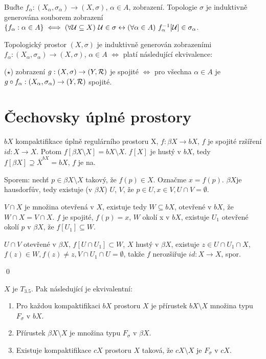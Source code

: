 \documentclass[12pt,a4paper]{article}
\newcommand\BX{\ensuremath{\beta X}}
\newcommand\Tich{$T_{3.5}$\xspace}
\newcommand\close{\overline}
\begin{document}
\tvrzeni Buďte $f_\alpha : (X_\alpha,\sigma_\alpha) \to (X,\sigma)$, $\alpha
\in A$, zobrazení. Topologie $\sigma$ je induktivně generována souborem
zobrazení $\{f_\alpha : \alpha \in A\}  \iff (\forall \mathcal{ U } \subseteq X)~\mathcal{ U }
\in \sigma \leftrightarrow (\forall \alpha \in A)~f_\alpha^{-1}[\mathcal{ U }]\in\sigma_\alpha$.

\veta Topologický prostor $(X,\sigma)$ je induktivně generován zobrazeními $f_\alpha : (X_\alpha,\sigma_\alpha) \to (X,\sigma)$, $\alpha \in A$ $\iff$ platí následující ekvivalence:

\begin{description}
\item{($\star$)} zobrazení $g : (X,\sigma) \to (Y, \mathcal{ R })$ je spojité $\iff$ pro všechna $\alpha \in A$ je $g \circ f_\alpha : (X_\alpha, \sigma_\alpha) \to (Y,\mathcal{ R })$ spojité.
\end{description}

\section{Čechovsky úplné prostory}
\lemma
	$bX$ kompaktifikace úplně regulárního prostoru X, $f: \beta X \to
	bX$, $f$ je spojité rzšíření $id: X \to X$. Potom $f[\beta
	X\setminus X] = bX \setminus X$.
\dukaz
	$f[X]$ je hustý v $bX$, tedy $f[\beta X] \supseteq \close X^{bX} = bX$,
	$f$ je na.

	Sporem: nechť $p \in \beta X \setminus X$ takový, že $f(p) \in
	X$. Označme $x = f(p)$. \BX je hausdorfův, tedy existuje (v \BX) $U$, $V$,
	že $p \in U, x \in V, U \cap V = \emptyset$.

	$V \cap X$ je množina otevřená v $X$, existuje tedy $W \subseteq bX$,
	otevřené v $bX$, že $W \cap X = V \cap X$. $f$ je spojité, $f(p) = x$, $W$
	okolí x v $bX$, existuje $U_1$ otevřené okolí $p$ v $\beta X$, že $f[U_1]
	\subseteq W$.
	
	$U \cap V$ otevřené v \BX, $f[U \cap U_1] \subset W$, $X$ hustý v
	$\beta X$, existuje $z \in U \cap U_1 \cap X$, $f(z) \in W, f(z) \neq z,
	V \cap U_1 \cap U = \emptyset$, takže $f$ nerozšiřuje $id: X \to
	X$, spor.

	\qed

\veta $X$ je \Tich. Pak následující je ekvivalentní:
\begin{enumerate}
	\item Pro každou kompaktifikaci $bX$ prostoru $X$ je přírustek $bX
		\setminus X$ množina typu $F_\sigma$ v $bX$.
	\item Přírustek $\beta X \setminus X$ je množina typu $F_\sigma$ v \BX.
	\item Existuje kompaktifikace $cX$ prostoru $X$ taková, že $cX \setminus X$
		je $F_\sigma$ v $cX$.
\end{enumerate}
\end{document}
